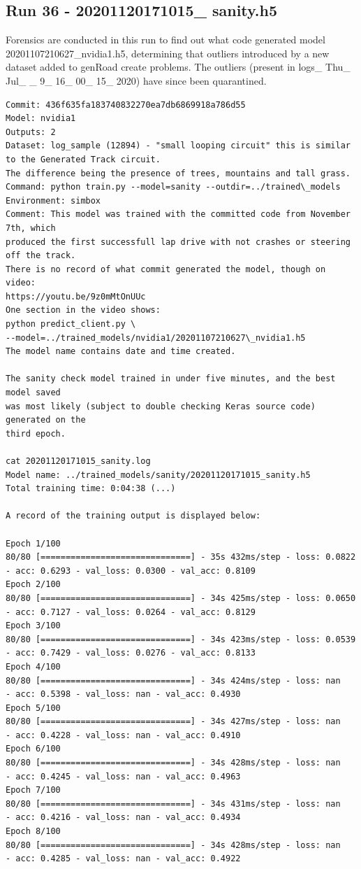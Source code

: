 \subsection{Run 36 - 20201120171015\_ sanity.h5}
Forensics are conducted in this run to find out what code generated model 
20201107210627\_nvidia1.h5, determining that outliers introduced by a new
dataset added to genRoad create problems. The outliers (present in 
logs\_ Thu\_ Jul\_ \_ 9\_ 16\_ 00\_ 15\_ 2020) have since been quarantined.

\label{app_res:36}

\begin{verbatim}
Commit: 436f635fa183740832270ea7db6869918a786d55
Model: nvidia1
Outputs: 2
Dataset: log_sample (12894) - "small looping circuit" this is similar to the Generated Track circuit.
The difference being the presence of trees, mountains and tall grass.
Command: python train.py --model=sanity --outdir=../trained\_models
Environment: simbox
Comment: This model was trained with the committed code from November 7th, which
produced the first successfull lap drive with not crashes or steering off the track.
There is no record of what commit generated the model, though on video:
https://youtu.be/9z0mMtOnUUc
One section in the video shows:
python predict_client.py \
--model=../trained_models/nvidia1/20201107210627\_nvidia1.h5
The model name contains date and time created.

The sanity check model trained in under five minutes, and the best model saved 
was most likely (subject to double checking Keras source code) generated on the
third epoch.

cat 20201120171015_sanity.log
Model name: ../trained_models/sanity/20201120171015_sanity.h5
Total training time: 0:04:38 (...)

A record of the training output is displayed below:

Epoch 1/100
80/80 [==============================] - 35s 432ms/step - loss: 0.0822 
- acc: 0.6293 - val_loss: 0.0300 - val_acc: 0.8109
Epoch 2/100
80/80 [==============================] - 34s 425ms/step - loss: 0.0650 
- acc: 0.7127 - val_loss: 0.0264 - val_acc: 0.8129
Epoch 3/100
80/80 [==============================] - 34s 423ms/step - loss: 0.0539 
- acc: 0.7429 - val_loss: 0.0276 - val_acc: 0.8133
Epoch 4/100
80/80 [==============================] - 34s 424ms/step - loss: nan 
- acc: 0.5398 - val_loss: nan - val_acc: 0.4930
Epoch 5/100
80/80 [==============================] - 34s 427ms/step - loss: nan 
- acc: 0.4228 - val_loss: nan - val_acc: 0.4910
Epoch 6/100
80/80 [==============================] - 34s 428ms/step - loss: nan 
- acc: 0.4245 - val_loss: nan - val_acc: 0.4963
Epoch 7/100
80/80 [==============================] - 34s 431ms/step - loss: nan 
- acc: 0.4216 - val_loss: nan - val_acc: 0.4934
Epoch 8/100
80/80 [==============================] - 34s 428ms/step - loss: nan 
- acc: 0.4285 - val_loss: nan - val_acc: 0.4922


\end{verbatim}
